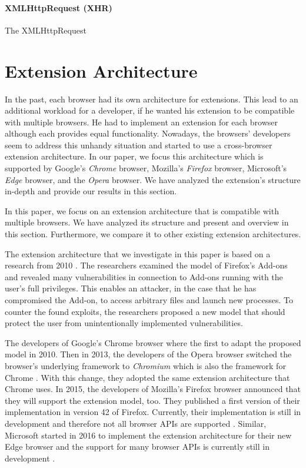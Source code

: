 \paragraph{XMLHttpRequest (XHR)}

	The XMLHttpRequest 


\newpage
\section{Extension Architecture}
	In the past, each browser had its own architecture for extensions. This lead to an additional workload for a developer, if he wanted his extension to be compatible with multiple browsers. He had to implement an extension for each browser although each provides equal functionality. Nowadays, the browsers' developers seem to address this unhandy situation and started to use a cross-browser extension architecture. In our paper, we focus this architecture which is supported by Google's \textit{Chrome} browser, Mozilla's \textit{Firefox} browser, Microsoft's \textit{Edge} browser, and the \textit{Opera} browser. We have analyzed the extension's structure in-depth and provide our results in this section.

	In this paper, we focus on an extension architecture that is compatible with multiple browsers. We have analyzed its structure and present and overview in this section. Furthermore, we compare it to other existing extension architectures.

	The extension architecture that we investigate in this paper is based on a research from 2010 \cite{Barth10protectingbrowsers}. The researchers examined the model of Firefox's Add-ons and revealed many vulnerabilities in connection to Add-ons running with the user's full privileges. This enables an attacker, in the case that he has compromised the Add-on, to access arbitrary files and launch new processes. To counter the found exploits, the researchers proposed a new model that should protect the user from unintentionally implemented vulnerabilities.

	The developers of Google's Chrome browser where the first to adapt the proposed model in 2010. Then in 2013, the developers of the Opera browser switched the browser's underlying framework to \textit{Chromium} which is also the framework for Chrome \cite{operaBlogSwitchToChromium}. With this change, they adopted the same extension architecture that Chrome uses. In 2015, the developers of Mozilla's Firefox browser announced that they will support the extension model, too. They published a first version of their implementation in version 42 of Firefox. Currently, their implementation is still in development and therefore not all browser APIs are supported \cite{mozillaWebExtensionStatus}. Similar, Microsoft started in 2016 to implement the extension architecture for their new Edge browser and the support for many browser APIs is currently still in development \cite{edgeBrowserApiStatus}.

